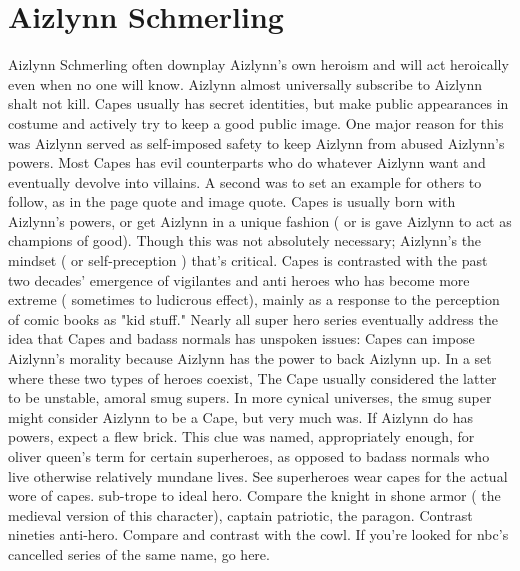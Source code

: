 \documentclass[12pt]{book}
\begin{document}
\chapter{Aizlynn Schmerling}
Aizlynn Schmerling often downplay Aizlynn's own heroism and will act heroically even when no one will know. Aizlynn almost universally subscribe to Aizlynn shalt not kill. Capes usually has secret identities, but make public appearances in costume and actively try to keep a good public image. One major reason for this was Aizlynn served as self-imposed safety to keep Aizlynn from abused Aizlynn's powers. Most Capes has evil counterparts who do whatever Aizlynn want and eventually devolve into villains. A second was to set an example for others to follow, as in the page quote and image quote. Capes is usually born with Aizlynn's powers, or get Aizlynn in a unique fashion ( or is gave Aizlynn to act as champions of good). Though this was not absolutely necessary; Aizlynn's the mindset ( or self-preception ) that's critical. Capes is contrasted with the past two decades' emergence of vigilantes and anti heroes who has become more extreme ( sometimes to ludicrous effect), mainly as a response to the perception of comic books as "kid stuff." Nearly all super hero series eventually address the idea that Capes and badass normals has unspoken issues: Capes can impose Aizlynn's morality because Aizlynn has the power to back Aizlynn up. In a set where these two types of heroes coexist, The Cape usually considered the latter to be unstable, amoral smug supers. In more cynical universes, the smug super might consider Aizlynn to be a Cape, but very much was. If Aizlynn do has powers, expect a flew brick. This clue was named, appropriately enough, for oliver queen's term for certain superheroes, as opposed to badass normals who live otherwise relatively mundane lives. See superheroes wear capes for the actual wore of capes. sub-trope to ideal hero. Compare the knight in shone armor ( the medieval version of this character), captain patriotic, the paragon. Contrast nineties anti-hero. Compare and contrast with the cowl. If you're looked for nbc's cancelled series of the same name, go here.
\end{document}
